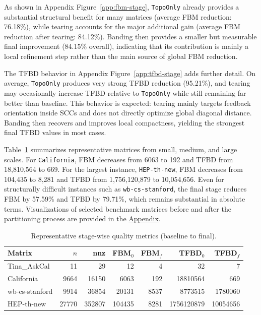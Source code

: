 \documentclass[12pt]{article}
\theoremstyle{definition}
\begin{document}
As shown in Appendix Figure~\ref{app:fbm-stage}, \texttt{TopoOnly} already provides a substantial structural benefit for many matrices (average FBM reduction: 76.18\%), while tearing accounts for the major additional gain (average FBM reduction after tearing: 84.12\%). Banding then provides a smaller but measurable final improvement (84.15\% overall), indicating that its contribution is mainly a local refinement step rather than the main source of global FBM reduction.

The TFBD behavior in Appendix Figure~\ref{app:tfbd-stage} adds further detail. On average, \texttt{TopoOnly} produces very strong TFBD reduction (95.21\%), and tearing may occasionally increase TFBD relative to \texttt{TopoOnly} while still remaining far better than baseline. This behavior is expected: tearing mainly targets feedback orientation inside SCCs and does not directly optimize global diagonal distance. Banding then recovers and improves local compactness, yielding the strongest final TFBD values in most cases.

Table~\ref{tab:quality-sample} summarizes representative matrices from small, medium, and large scales. For \texttt{California}, FBM decreases from 6063 to 192 and TFBD from 18,810,564 to 669. For the largest instance, \texttt{HEP-th-new}, FBM decreases from 104,435 to 8,281 and TFBD from 1,756,120,879 to 10,054,656. Even for structurally difficult instances such as \texttt{wb-cs-stanford}, the final stage reduces FBM by 57.59\% and TFBD by 79.71\%, which remains substantial in absolute terms. Visualizations of selected benchmark matrices before and after the partitioning process are provided in the \hyperref[sec:appendix]{Appendix}.

\begin{table}[H]
\centering
\caption{Representative stage-wise quality metrics (baseline to final).}
\label{tab:quality-sample}
\small
\begin{tabular}{lrrrrrr}
\toprule
Matrix & $n$ & nnz & FBM$_0$ & FBM$_f$ & TFBD$_0$ & TFBD$_f$ \\
\midrule
Tina\_AskCal      & 11    & 29      & 12      & 4       & 32          & 7 \\
California        & 9664  & 16150   & 6063    & 192     & 18810564    & 669 \\
wb-cs-stanford    & 9914  & 36854   & 20131   & 8537    & 8773515     & 1780060 \\
HEP-th-new        & 27770 & 352807  & 104435  & 8281    & 1756120879  & 10054656 \\
\bottomrule
\end{tabular}
\end{table}
\end{document}

